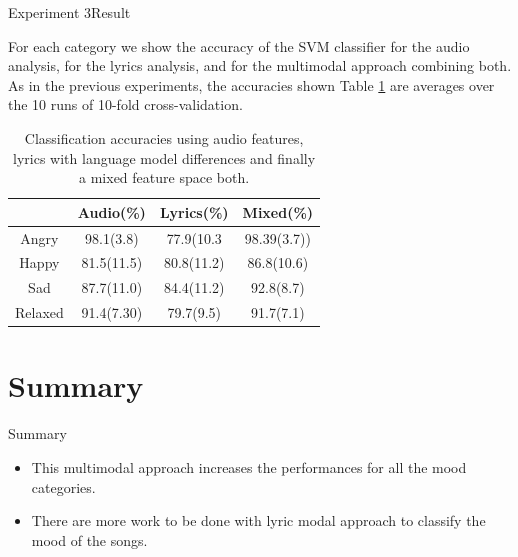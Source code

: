 \documentclass{beamer}
\begin{document}
\begin{frame}{Experiment 3}{Result}

{\tiny For each category we show the accuracy of the SVM classifier for the audio analysis, for the lyrics analysis, and for the multimodal approach combining both. As in the previous experiments, the accuracies shown Table \ref{table:last} are averages over the 10 runs of 10-fold cross-validation.}
	\begin{table}[tbh]
		\centering
		\label{table:last}
		
		\begin{tabular}{|c|c|c|c|}
		\hline
		        & Audio(\%) & Lyrics(\%) & Mixed(\%) \\ \hline
		  Angry & 98.1(3.8) & 77.9(10.3 & 98.39(3.7)) \\ \hline
		  Happy & 81.5(11.5) & 80.8(11.2) & 86.8(10.6) \\ \hline
		  Sad &  87.7(11.0) & 84.4(11.2) & 92.8(8.7)\\ \hline
		  Relaxed & 91.4(7.30) & 79.7(9.5) & 91.7(7.1) \\ \hline

		\end{tabular}
		\caption{Classification accuracies using audio features, lyrics with language model differences and finally a mixed feature space both.}
	\end{table} 
\end{frame}


\section{Summary}

\begin{frame}{Summary}
  \begin{itemize}
  \item
  {
  	This multimodal approach increases the performances for all the mood categories. 
  }  
  \item
    There are more work to be done with lyric modal approach to classify the mood of the songs. 
  
  \end{itemize}
  
  
\end{frame}



\end{document}
